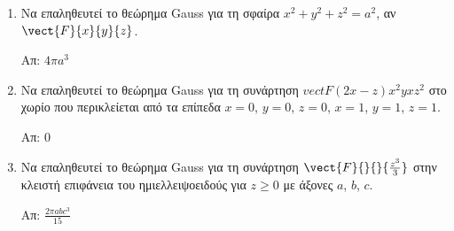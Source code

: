 






\thispagestyle{empty}

\begin{center}
\end{center}

\vspace{\baselineskip}

\begin{enumerate}

\item Να επαληθευτεί το θεώρημα \textlatin{Gauss} για τη σφαίρα $x^{2}+y^{2}+z^{2}=a^{2}$, αν $\vect{F}{x}{y}{z}$.

\hfill Απ: $4\pi a^{3}$

\item Να επαληθευτεί το θεώρημα \textlatin{Gauss} για τη συνάρτηση $vect{F}{(2x-z)}{x^{2}y}{xz^{2}}$ στο χωρίο που περικλείεται από τα επίπεδα $x=0$, $y=0$, $z=0$, $x=1$, $y=1$, $z=1$.

\hfill Απ: $0$

\item Να επαληθευτεί το θεώρημα \textlatin{Gauss} για τη συνάρτηση $\vect{F}{}{}{\frac{z^{3}}{3}}$ στην κλειστή επιφάνεια του ημιελλειψοειδούς για $z\geq 0$ με άξονες $a$, $b$, $c$.

\hfill Απ: $\frac{2\pi a b c^{3}}{15}$

\end{enumerate}


